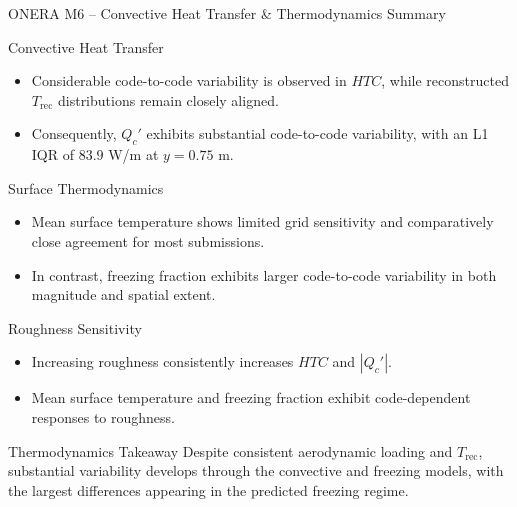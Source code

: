 

\begin{frame}{\small ONERA M6 -- Convective Heat Transfer \& Thermodynamics Summary}
\scriptsize

\begin{block}{\scriptsize Convective Heat Transfer}
\begin{itemize}
    \item Considerable code-to-code variability is observed in $HTC$, while reconstructed $T_{\mathrm{rec}}$ distributions remain closely aligned.
    \item Consequently, $Q_c'$ exhibits substantial code-to-code variability, with an L1 IQR of $83.9$ W/m at $y=0.75$ m.
\end{itemize}
\end{block}

\vspace{0.10cm}

\begin{block}{\scriptsize Surface Thermodynamics}
\begin{itemize}
    \item Mean surface temperature shows limited grid sensitivity and comparatively close agreement for most submissions.
    \item In contrast, freezing fraction exhibits larger code-to-code variability in both magnitude and spatial extent.
\end{itemize}
\end{block}

\vspace{0.10cm}

\begin{block}{\scriptsize Roughness Sensitivity}
\begin{itemize}
    \item Increasing roughness consistently increases $HTC$ and $|Q_c'|$.
    \item Mean surface temperature and freezing fraction exhibit code-dependent responses to roughness.
\end{itemize}
\end{block}

\vspace{0.10cm}

\begin{alertblock}{\scriptsize Thermodynamics Takeaway}
Despite consistent aerodynamic loading and $T_{\mathrm{rec}}$, substantial variability develops through the convective and freezing models, with the largest differences appearing in the predicted freezing regime.
\end{alertblock}

\end{frame}



